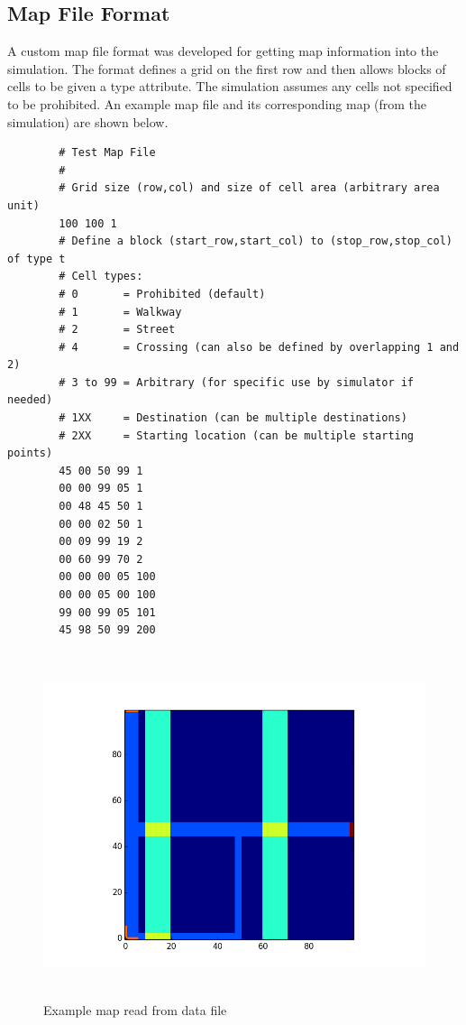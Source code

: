 \documentclass[paper=a4, fontsize=11pt]{scrartcl}
\numberwithin{equation}{section}		%
\numberwithin{figure}{section}			%
\numberwithin{table}{section}		    %
\begin{document}
	\newpage
	\begin{appendices}
		\section{Map File Format}
		A custom map file format was developed for getting map information into the simulation. The 
		format defines a grid on the first row and then allows blocks of cells to be given a type 
		attribute. The simulation assumes any cells not specified to be prohibited. An example map 
		file and its corresponding map (from the simulation) are shown below. 
		
		\begin{verbatim}
		# Test Map File
		#
		# Grid size (row,col) and size of cell area (arbitrary area unit)
		100 100 1
		# Define a block (start_row,start_col) to (stop_row,stop_col) of type t
		# Cell types:
		# 0       = Prohibited (default)
		# 1       = Walkway
		# 2       = Street
		# 4       = Crossing (can also be defined by overlapping 1 and 2)
		# 3 to 99 = Arbitrary (for specific use by simulator if needed)
		# 1XX     = Destination (can be multiple destinations)
		# 2XX     = Starting location (can be multiple starting points)
		45 00 50 99 1
		00 00 99 05 1
		00 48 45 50 1
		00 00 02 50 1
		00 09 99 19 2
		00 60 99 70 2
		00 00 00 05 100
		00 00 05 00 100
		99 00 99 05 101
		45 98 50 99 200
		\end{verbatim}
		
		\begin{figure}[H]
			\begin{center} 
				\includegraphics[height=4in,width=5.5in]{map_test_02} 
				\caption{Example map read from data file\label{fig:A:1}} 
			\end{center} 
		\end{figure}
		
	\end{appendices}  
	
\end{document}
